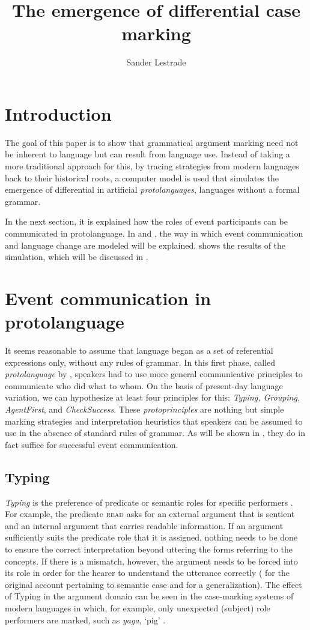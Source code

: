 \documentclass[output=paper]{LSP/langsci}
\author{Sander Lestrade\affiliation{Centre for Language Studies, Radboud University}}
\title{The emergence of differential case marking}
\begin{document}
\section{Introduction}\label{17-le-sec:Intro}
 The goal of this paper is to show that grammatical argument marking need not be inherent to language but can result from language use. Instead of taking a more traditional approach for this, \ie by tracing strategies from modern languages back to their historical roots, a computer model is used that simulates the emergence of differential  in artificial \textit{protolanguages}, languages without a formal grammar. 

In the next section, it is explained how the roles of event participants can be communicated in protolanguage. In  and , the way in which event communication and language change are modeled will be explained.  shows the results of the simulation, which will be discussed in .

\section{Event communication in protolanguage}\label{17-le-sec:Event}
It seems reasonable to assume that language began as a set of referential expressions only, without any rules of grammar. In this first phase, called \textit{protolanguage} by \cite{Bickerton1981Roots}, speakers had to use more general communicative principles to communicate who did what to whom. On the basis of present-day language variation, we can hypothesize at least four principles for this: \textit{Typing, Grouping, AgentFirst}, and \textit{CheckSuccess}. These \textit{protoprinciples }are nothing but simple marking strategies and interpretation heuristics that speakers can be assumed to use in the absence of standard rules of grammar. As will be shown in , they do in fact suffice for successful event communication. 

\subsection{Typing}\label{17-le-sec:Event-Typing}
\textit{Typing} is the preference of predicate or semantic roles for specific performers \citep{aristar96, aristar97}. For example, the predicate \textsc{read} asks for an external argument that is sentient and an internal argument that carries readable information. If an argument sufficiently suits the predicate role that it is assigned, nothing needs to be done to ensure the correct interpretation beyond uttering the forms referring to the concepts. If there is a mismatch, however, the argument needs to be forced into its role in order for the hearer to understand the utterance correctly (\cf \citealt{aristar96, aristar97} for the original account pertaining to semantic case and \citealt{dissertatie, casealternations} for a generalization). The effect of Typing in the argument domain can be seen in the case-marking systems of modern languages in which, for example, only unexpected (subject) role performers are marked, such as \textit{yaga}, `pig' \citep{donohueanddonohue}.
\end{document}
